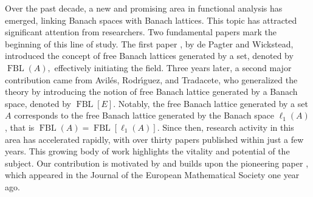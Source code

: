 \documentclass[12pt]{article}%
\begin{document}
Over the past decade, a new and promising area in functional analysis has
emerged, linking Banach spaces with Banach lattices. This topic has attracted
significant attention from researchers. Two fundamental papers mark the
beginning of this line of study. The first paper \cite{L-332}, by de Pagter
and Wickstead, introduced the concept of free Banach lattices generated by a
set, denoted by $\operatorname*{FBL}\left(  A\right)  ,$ effectively
initiating the field. Three years later, a second major contribution
\cite{L-403} came from Avil\'{e}s, Rodr\'{\i}guez, and Tradacete, who
generalized the theory by introducing the notion of free Banach lattice
generated by a Banach space, denoted by $\operatorname*{FBL}\left[  E\right]
$. Notably, the free Banach lattice generated by a set $A$ corresponds to the
free Banach lattice generated by the Banach space $\ell_{1}\left(  A\right)
$, that is $\operatorname*{FBL}\left(  A\right)  =\operatorname*{FBL}\left[
\ell_{1}\left(  A\right)  \right]  .$ Since then, research activity in this
area has accelerated rapidly, with over thirty papers published within just a
few years. This growing body of work highlights the vitality and potential of
the subject. Our contribution is motivated by and builds upon the pioneering
paper \cite{L-925}, which appeared in the Journal of the European Mathematical
Society one year ago.
\end{document}
